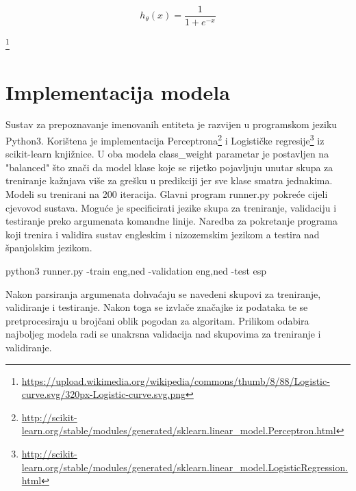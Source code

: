 \documentclass[times, utf8, seminar]{fer}
\begin{document}
\[ h_\theta(x) = \dfrac{1}{1+e^{-x}}\]

\begin{center}
\footnote{\url{https://upload.wikimedia.org/wikipedia/commons/thumb/8/88/Logistic-curve.svg/320px-Logistic-curve.svg.png}}
\end{center}

\chapter{Implementacija modela}
Sustav za prepoznavanje imenovanih entiteta je razvijen u programskom jeziku Python3. Korištena je implementacija Perceptrona\footnote{\url{http://scikit-learn.org/stable/modules/generated/sklearn.linear_model.Perceptron.html}} i Logističke regresije\footnote{\url{http://scikit-learn.org/stable/modules/generated/sklearn.linear_model.LogisticRegression.html}} iz scikit-learn knjižnice. U oba modela class\_weight parametar je postavljen na "balanced" što znači da model klase koje se rijetko pojavljuju unutar skupa za treniranje kažnjava više za grešku u predikciji jer sve klase smatra jednakima. Modeli su trenirani na 200 iteracija.
Glavni program runner.py pokreće cijeli cjevovod sustava. Moguće je specificirati jezike skupa za treniranje, validaciju i testiranje preko argumenata komandne linije. Naredba za pokretanje programa koji trenira i validira sustav engleskim i nizozemskim jezikom a testira nad španjolskim jezikom.
\begin{center}
python3 runner.py -train eng,ned -validation eng,ned -test esp
\end{center}

Nakon parsiranja argumenata dohvaćaju se navedeni skupovi za treniranje, validiranje i testiranje. Nakon toga se izvlače značajke iz podataka te se pretprocesiraju u brojčani oblik pogodan za algoritam. Prilikom odabira najboljeg modela radi se unakrsna validacija nad skupovima za treniranje i validiranje. 
\end{document}
